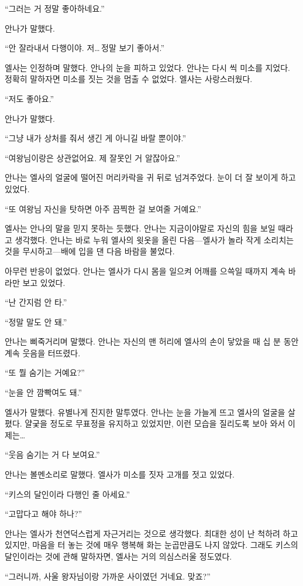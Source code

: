 ``그러는 거 정말 좋아하네요.''

안나가 말했다.

``안 잘라내서 다행이야. 저\ldots\,정말 보기 좋아서.''

엘사는 인정하며 말했다. 안나의 눈을 피하고 있었다. 안나는 다시 씩 미소를 지었다. 정확히 말하자면 미소를 짓는 것을 멈출 수 없었다. 엘사는 사랑스러웠다.

``저도 좋아요.''

안나가 말했다.

``그냥 내가 상처를 줘서 생긴 게 아니길 바랄 뿐이야.''

``여왕님이랑은 상관없어요. 제 잘못인 거 알잖아요.''

안나는 엘사의 얼굴에 떨어진 머리카락을 귀 뒤로 넘겨주었다. 눈이 더 잘 보이게 하고 있었다.

``또 여왕님 자신을 탓하면 아주 끔찍한 걸 보여줄 거예요.''

엘사는 안나의 말을 믿지 못하는 듯했다. 안나는 지금이야말로 자신의 힘을 보일 때라고 생각했다. 안나는 바로 누워 엘사의 윗옷을 올린 다음—엘사가 놀라 작게 소리치는 것을 무시하고—배에 입을 댄 다음 바람을 불었다.

아무런 반응이 없었다. 안나는 엘사가 다시 몸을 일으켜 어깨를 으쓱일 때까지 계속 바라만 보고 있었다.

``난 간지럼 안 타.''

``정말 말도 안 돼.''

안나는 삐죽거리며 말했다. 안나는 자신의 맨 허리에 엘사의 손이 닿았을 때 십 분 동안 계속 웃음을 터뜨렸다.

``또 뭘 숨기는 거예요?''

``눈을 안 깜빡여도 돼.''

엘사가 말했다. 유별나게 진지한 말투였다. 안나는 눈을 가늘게 뜨고 엘사의 얼굴을 살폈다. 얄궂을 정도로 무표정을 유지하고 있었지만, 이런 모습을 질리도록 보아 와서 이제는\ldots

``웃음 숨기는 거 다 보여요.''

안나는 볼멘소리로 말했다. 엘사가 미소를 짓자 고개를 젓고 있었다.

``키스의 달인이라 다행인 줄 아세요.''

``고맙다고 해야 하나?''

안나는 엘사가 천연덕스럽게 자근거리는 것으로 생각했다. 최대한 성이 난 척하려 하고 있지만, 마음을 터 놓는 것에 매우 행복해 화는 눈곱만큼도 나지 않았다. 그래도 키스의 달인이라는 것에 관해 말하자면, 엘사는 거의 의심스러울 정도였다.

``그러니까, 사울 왕자님이랑 가까운 사이였던 거네요. 맞죠?''

